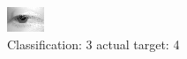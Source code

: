 \begin{figure}[h!]
\begin{center}
\includegraphics[width=0.60\columnwidth]{figures/ID2712_class_3_target_4.png}
\end{center}
\caption{ Classification: 3 actual target: 4}
\label{fig:ID2712_class_3_target_4}
\end{figure}
